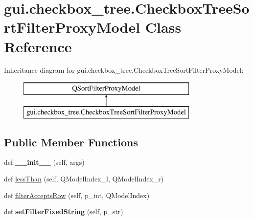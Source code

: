 \hypertarget{classgui_1_1checkbox__tree_1_1_checkbox_tree_sort_filter_proxy_model}{}\section{gui.\+checkbox\+\_\+tree.\+Checkbox\+Tree\+Sort\+Filter\+Proxy\+Model Class Reference}
\label{classgui_1_1checkbox__tree_1_1_checkbox_tree_sort_filter_proxy_model}
Inheritance diagram for gui.\+checkbox\+\_\+tree.\+Checkbox\+Tree\+Sort\+Filter\+Proxy\+Model\+:\begin{figure}[H]
\begin{center}
\leavevmode
\includegraphics[height=2.000000cm]{d7/d4d/classgui_1_1checkbox__tree_1_1_checkbox_tree_sort_filter_proxy_model}
\end{center}
\end{figure}
\subsection*{Public Member Functions}
\begin{DoxyCompactItemize}
\item 
\mbox{\label{classgui_1_1checkbox__tree_1_1_checkbox_tree_sort_filter_proxy_model_ac71e6e55ddbc9366a8f987cbd2a880b9}} 
def {\bfseries \+\_\+\+\_\+init\+\_\+\+\_\+} (self, args)
\item 
def \mbox{\hyperlink{classgui_1_1checkbox__tree_1_1_checkbox_tree_sort_filter_proxy_model_ac4ca29a3001de8c3f70af8689de85e00}{less\+Than}} (self, Q\+Model\+Index\+\_\+l, Q\+Model\+Index\+\_\+r)
\item 
def \mbox{\hyperlink{classgui_1_1checkbox__tree_1_1_checkbox_tree_sort_filter_proxy_model_abfcf80b4ad1d213abd7beeecb7ef8afb}{filter\+Accepts\+Row}} (self, p\+\_\+int, Q\+Model\+Index)
\item 
\mbox{\label{classgui_1_1checkbox__tree_1_1_checkbox_tree_sort_filter_proxy_model_a56a8ca14ec2fe92f37dc87dafd9f1035}} 
def {\bfseries set\+Filter\+Fixed\+String} (self, p\+\_\+str)
\end{DoxyCompactItemize}
